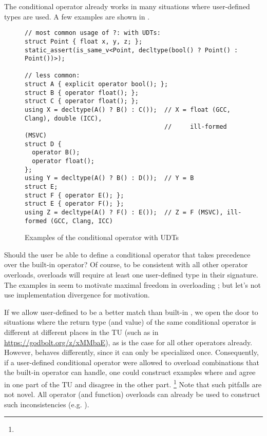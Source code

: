 The conditional operator already works in many situations where user-defined types are used.
A few examples are shown in .
\begin{figure}[bht]\begin{lstlisting}
// most common usage of ?: with UDTs:
struct Point { float x, y, z; };
static_assert(is_same_v<Point, decltype(bool() ? Point() : Point())>);

// less common:
struct A { explicit operator bool(); };
struct B { operator float(); };
struct C { operator float(); };
using X = decltype(A() ? B() : C());  // X = float (GCC, Clang), double (ICC),
                                      //     ill-formed (MSVC)
struct D {
  operator B();
  operator float();
};
using Y = decltype(A() ? B() : D());  // Y = B
struct E;
struct F { operator E(); };
struct E { operator F(); };
using Z = decltype(A() ? F() : E());  // Z = F (MSVC), ill-formed (GCC, Clang, ICC)
\end{lstlisting}
\caption{Examples of the conditional operator with UDTs}
\label{fig:udt-cond-examples}
\end{figure}

Should the user be able to define a conditional operator that takes precedence over the built-in operator?
Of course, to be consistent with all other operator overloads,  overloads will require at least one user-defined type in their signature.
The examples in  seem to motivate maximal freedom in overloading ; but let's not use implementation divergence for motivation.

If we allow user-defined  to be a better match than built-in , we open the door to situations where the return type (and value) of the same conditional operator is different at different places in the TU (such as in \url{https://godbolt.org/z/xMMbaE}), as is the case for all other operators already.
However,  behaves differently, since it can only be specialized once.
Consequently, if a user-defined conditional operator were allowed to overload combinations that the built-in operator can handle, one could construct examples where  and  agree in one part of the TU and disagree in the other part.%
\footnote{}
Note that such pitfalls are not novel.
All operator (and function) overloads can already be used to construct such inconsistencies (e.g. ).

